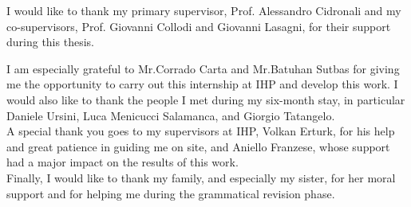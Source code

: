 
I would like to thank my primary supervisor, Prof. Alessandro Cidronali and my co-supervisors, Prof. Giovanni Collodi and Giovanni Lasagni, for their support during this thesis.

I am especially grateful to Mr.Corrado Carta and Mr.Batuhan Sutbas for giving me the opportunity to carry out this internship at IHP and develop this work. I would also like to thank the people I met during my six-month stay, in particular Daniele Ursini, Luca Menicucci Salamanca, and Giorgio Tatangelo.\\
A special thank you goes to my supervisors at IHP, Volkan Erturk, for his help and great patience in guiding me on site, and Aniello Franzese, whose support had a major impact on the results of this work.
\\

Finally, I would like to thank my family, and especially my sister, for her moral support and for helping me during the grammatical revision phase.



